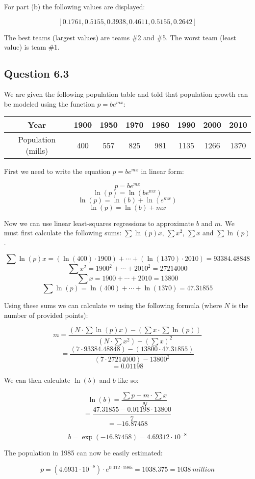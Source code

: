 \documentclass[12pt]{article}
\begin{document}
\noindent For part (b) the following values are displayed:

$$[0.1761, 0.5155, 0.3938, 0.4611, 0.5155, 0.2642]$$

\noindent The best teams (largest values) are teams \#2 and \#5. The worst team (least value) is team \#1.

\subsection*{Question 6.3}

\noindent We are given the following population table and told that population growth can be modeled using the function $p = be^{mx}$:

\begin{center}
    \begin{tabular}{ |c|c|c|c|c|c|c|c| } 
        \hline
        Year & 1900 & 1950 & 1970 & 1980 & 1990 & 2000 & 2010\\
        \hline
        Population (mills) & 400 & 557 & 825 & 981 & 1135 & 1266 & 1370\\
        \hline
    \end{tabular}
\end{center}

\noindent First we need to write the equation $p = be^{mx}$ in linear form:

$$p = be^{mx}$$
$$\ln(p) = \ln(be^{mx})$$
$$\ln(p) = \ln(b) + \ln(e^{mx})$$
$$\ln(p) = \ln(b) + mx$$

\indent Now we can use linear least-squares regressions to approximate $b$ and $m$. We must first calculate the following sums: $\sum \ln(p)x$, $\sum x^2$, $\sum x$ and $\sum \ln(p)$.

$$\sum \ln(p)x = (\ln(400) \cdot 1900) + \cdots + (\ln(1370) \cdot 2010) = 93384.48848$$
$$\sum x^2 = 1900^2 + \cdots + 2010^2 = 27214000$$
$$\sum x = 1900 + \cdots + 2010 = 13800$$
$$\sum \ln(p) = \ln(400) + \cdots + \ln(1370) = 47.31855$$

\indent Using these sums we can calculate $m$ using the following formula (where $N$ is the number of provided points):

$$m = \frac{\left( N \cdot \sum \ln(p)x \right) - \left( \sum x \cdot \sum \ln(p) \right)}{\left( N \cdot \sum x^2 \right) - \left( \sum x \right)^2}$$
$$= \frac{\left( 7 \cdot 93384.48848 \right) - \left( 13800 \cdot 47.31855 \right)}{\left( 7 \cdot 27214000 \right) - 13800^2}$$
$$= 0.01198$$

\indent We can then calculate $\ln(b)$ and $b$ like so:

$$\ln(b) = \frac{\sum p - m \cdot \sum x}{N}$$
$$= \frac{47.31855 - 0.01198 \cdot 13800}{7}$$
$$= -16.87458$$

$$b = \exp(-16.87458) = 4.69312 \cdot 10^{-8}$$

\indent The population in 1985 can now be easily estimated:

$$p = (4.6931 \cdot 10^{-8}) \cdot e^{0.012 \cdot 1985} = 1038.375 = 1038 \: million$$
\end{document}

